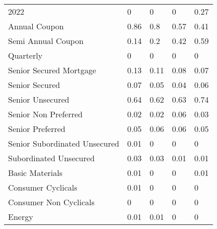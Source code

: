 \begin{table}[H]
\begin{tabular}{lllll}
2022 & \cellcolor[HTML]{FCFCFF}0 & \cellcolor[HTML]{FCFCFF}0 & \cellcolor[HTML]{FCFCFF}0 & \cellcolor[HTML]{CCE9D6}0.27 \\
Annual Coupon & \cellcolor[HTML]{63BE7B}0.86 & \cellcolor[HTML]{6EC385}0.8 & \cellcolor[HTML]{97D3A8}0.57 & \cellcolor[HTML]{B4DFC1}0.41 \\
Semi Annual   Coupon & \cellcolor[HTML]{E4F2EA}0.14 & \cellcolor[HTML]{D9EEE1}0.2 & \cellcolor[HTML]{B2DEBF}0.42 & \cellcolor[HTML]{94D2A5}0.59 \\
Quarterly & \cellcolor[HTML]{FCFCFF}0 & \cellcolor[HTML]{FCFCFF}0 & \cellcolor[HTML]{FCFCFF}0 & \cellcolor[HTML]{FCFCFF}0 \\
Senior   Secured Mortgage & \cellcolor[HTML]{E5F3EC}0.13 & \cellcolor[HTML]{E9F5EF}0.11 & \cellcolor[HTML]{EEF7F3}0.08 & \cellcolor[HTML]{F0F7F5}0.07 \\
Senior Secured & \cellcolor[HTML]{F0F7F5}0.07 & \cellcolor[HTML]{F4F9F8}0.05 & \cellcolor[HTML]{F5FAF9}0.04 & \cellcolor[HTML]{F2F8F6}0.06 \\
Senior Unsecured & \cellcolor[HTML]{8BCE9D}0.64 & \cellcolor[HTML]{8ED0A0}0.62 & \cellcolor[HTML]{8CCF9F}0.63 & \cellcolor[HTML]{79C78E}0.74 \\
Senior Non   Preferred & \cellcolor[HTML]{F9FBFC}0.02 & \cellcolor[HTML]{F9FBFC}0.02 & \cellcolor[HTML]{F2F8F6}0.06 & \cellcolor[HTML]{F7FAFB}0.03 \\
Senior Preferred & \cellcolor[HTML]{F4F9F8}0.05 & \cellcolor[HTML]{F2F8F6}0.06 & \cellcolor[HTML]{F2F8F6}0.06 & \cellcolor[HTML]{F4F9F8}0.05 \\
Senior   Subordinated Unsecured & \cellcolor[HTML]{FBFCFE}0.01 & \cellcolor[HTML]{FCFCFF}0 & \cellcolor[HTML]{FCFCFF}0 & \cellcolor[HTML]{FCFCFF}0 \\
Subordinated   Unsecured & \cellcolor[HTML]{F7FAFB}0.03 & \cellcolor[HTML]{F7FAFB}0.03 & \cellcolor[HTML]{FBFCFE}0.01 & \cellcolor[HTML]{FBFCFE}0.01 \\
Basic Materials & \cellcolor[HTML]{FBFCFE}0.01 & \cellcolor[HTML]{FCFCFF}0 & \cellcolor[HTML]{FCFCFF}0 & \cellcolor[HTML]{FBFCFE}0.01 \\
Consumer   Cyclicals & \cellcolor[HTML]{FBFCFE}0.01 & \cellcolor[HTML]{FCFCFF}0 & \cellcolor[HTML]{FCFCFF}0 & \cellcolor[HTML]{FCFCFF}0 \\
Consumer   Non Cyclicals & \cellcolor[HTML]{FCFCFF}0 & \cellcolor[HTML]{FCFCFF}0 & \cellcolor[HTML]{FCFCFF}0 & \cellcolor[HTML]{FCFCFF}0 \\
Energy & \cellcolor[HTML]{FBFCFE}0.01 & \cellcolor[HTML]{FBFCFE}0.01 & \cellcolor[HTML]{FCFCFF}0 & \cellcolor[HTML]{FCFCFF}0 \\

\end{tabular}
\end{table}
